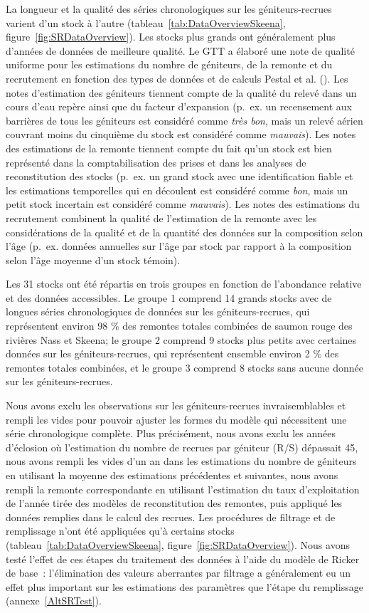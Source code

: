 \documentclass[french,11pt]{book}
\begin{document}
La longueur et la qualité des séries chronologiques sur les géniteurs-recrues varient d'un stock à l'autre (tableau~\ref{tab:DataOverviewSkeena}, figure~\ref{fig:SRDataOverview}). Les stocks plus grands ont généralement plus d'années de données de meilleure qualité. Le GTT a élaboré une note de qualité uniforme pour les estimations du nombre de géniteurs, de la remonte et du recrutement en fonction des types de données et de calculs Pestal et al. (). Les notes d'estimation des géniteurs tiennent compte de la qualité du relevé dans un cours d'eau repère ainsi que du facteur d'expansion (p.~ex. un recensement aux barrières de tous les géniteurs est considéré comme \emph{très bon}, mais un relevé aérien couvrant moins du cinquième du stock est considéré comme \emph{mauvais}). Les notes des estimations de la remonte tiennent compte du fait qu'un stock est bien représenté dans la comptabilisation des prises et dans les analyses de reconstitution des stocks (p.~ex. un grand stock avec une identification fiable et les estimations temporelles qui en découlent est considéré comme \emph{bon}, mais un petit stock incertain est considéré comme \emph{mauvais}). Les notes des estimations du recrutement combinent la qualité de l'estimation de la remonte avec les considérations de la qualité et de la quantité des données sur la composition selon l'âge (p.~ex. données annuelles sur l'âge par stock par rapport à la composition selon l'âge moyenne d'un stock témoin).

Les 31 stocks ont été répartis en trois groupes en fonction de l'abondance relative et des données accessibles. Le groupe 1 comprend 14 grands stocks avec de longues séries chronologiques de données sur les géniteurs-recrues, qui représentent environ 98 \% des remontes totales combinées de saumon rouge des rivières Nass et Skeena; le groupe 2 comprend 9 stocks plus petits avec certaines données sur les géniteurs-recrues, qui représentent ensemble environ 2 \% des remontes totales combinées, et le groupe 3 comprend 8 stocks sans aucune donnée sur les géniteurs-recrues.

Nous avons exclu les observations sur les géniteurs-recrues invraisemblables et rempli les vides pour pouvoir ajuster les formes du modèle qui nécessitent une série chronologique complète. Plus précisément, nous avons exclu les années d'éclosion où l'estimation du nombre de recrues par géniteur (R/S) dépassait 45, nous avons rempli les vides d'un an dans les estimations du nombre de géniteurs en utilisant la moyenne des estimations précédentes et suivantes, nous avons rempli la remonte correspondante en utilisant l'estimation du taux d'exploitation de l'année tirée des modèles de reconstitution des remontes, puis appliqué les données remplies dans le calcul des recrues. Les procédures de filtrage et de remplissage n'ont été appliquées qu'à certains stocks (tableau~\ref{tab:DataOverviewSkeena}, figure~\ref{fig:SRDataOverview}). Nous avons testé l'effet de ces étapes du traitement des données à l'aide du modèle de Ricker de base~: l'élimination des valeurs aberrantes par filtrage a généralement eu un effet plus important sur les estimations des paramètres que l'étape du remplissage (annexe~\ref{AltSRTest}).
\end{document}
